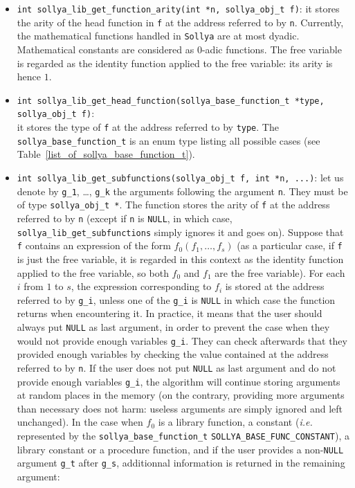 \documentclass[a4paper]{article}
\newcommand{\sollya}{\texttt{Sollya}\xspace}
\begin{document}
\begin{itemize}
\item \verb|int sollya_lib_get_function_arity(int *n, sollya_obj_t f)|: it stores the arity of the head function in \texttt{f} at the address referred to by \texttt{n}. Currently, the mathematical functions handled in \sollya are at most dyadic. Mathematical constants are considered as 0-adic functions. The free variable is regarded as the identity function applied to the free variable: its arity is hence $1$.
\item \verb|int sollya_lib_get_head_function(sollya_base_function_t *type, sollya_obj_t f)|:\\
it stores the type of \texttt{f} at the address referred to by \texttt{type}. The \texttt{sollya\_base\_function\_t} is an enum type listing all possible cases (see Table~\ref{list_of_sollya_base_function_t}).
\item \verb|int sollya_lib_get_subfunctions(sollya_obj_t f, int *n, ...)|: let us denote by \texttt{g\_1}, \dots, \texttt{g\_k} the arguments following the argument \texttt{n}. They must be of type \verb|sollya_obj_t *|. The function stores the arity of \texttt{f} at the address referred to by \texttt{n} (except if \texttt{n} is \verb|NULL|, in which case, \verb|sollya_lib_get_subfunctions| simply ignores it and goes on). Suppose that \texttt{f} contains an expression of the form $f_0(f_1,\dots,f_s)$ (as a particular case, if \texttt{f} is just the free variable, it is regarded in this context as the identity function applied to the free variable, so both $f_0$ and $f_1$ are the free variable). For each $i$ from $1$ to $s$, the expression corresponding to $f_i$ is stored at the address referred to by \texttt{g\_i}, unless one of the \texttt{g\_i} is \texttt{NULL} in which case the function returns when encountering it. In practice, it means that the user should always put \texttt{NULL} as last argument, in order to prevent the case when they would not provide enough variables \texttt{g\_i}. They can check afterwards that they provided enough variables by checking the value contained at the address referred to by \texttt{n}. If the user does not put \texttt{NULL} as last argument and do not provide enough variables \texttt{g\_i}, the algorithm will continue storing arguments at random places in the memory (on the contrary, providing more arguments than necessary does not harm: useless arguments are simply ignored and left unchanged). In the case when $f_0$ is a library function, a constant (\emph{i.e.} represented by the \verb|sollya_base_function_t| \verb|SOLLYA_BASE_FUNC_CONSTANT|), a library constant or a procedure function, and if the user provides a non-\texttt{NULL} argument \texttt{g\_t} after \texttt{g\_s}, additionnal information is returned in the remaining argument:

\end{itemize}
\end{document}
